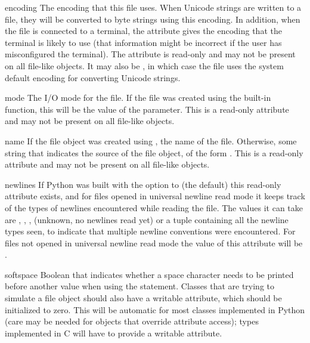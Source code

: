 \begin{memberdesc}[file]{encoding}
The encoding that this file uses. When Unicode strings are written
to a file, they will be converted to byte strings using this encoding.
In addition, when the file is connected to a terminal, the attribute
gives the encoding that the terminal is likely to use (that 
information might be incorrect if the user has misconfigured the 
terminal). The attribute is read-only and may not be present on
all file-like objects. It may also be , in which case
the file uses the system default encoding for converting Unicode
strings.

\end{memberdesc}

\begin{memberdesc}[file]{mode}
The I/O mode for the file.  If the file was created using the
 built-in function, this will be the value of the
 parameter.  This is a read-only attribute and may not be
present on all file-like objects.
\end{memberdesc}

\begin{memberdesc}[file]{name}
If the file object was created using , the name of
the file.  Otherwise, some string that indicates the source of the
file object, of the form \samp{<\mbox{\ldots}>}.  This is a read-only
attribute and may not be present on all file-like objects.
\end{memberdesc}

\begin{memberdesc}[file]{newlines}
If Python was built with the 
option to  (the default) this read-only attribute
exists, and for files opened in
universal newline read mode it keeps track of the types of newlines
encountered while reading the file. The values it can take are
, , ,  (unknown,
no newlines read yet) or a tuple containing all the newline
types seen, to indicate that multiple
newline conventions were encountered. For files not opened in universal
newline read mode the value of this attribute will be .
\end{memberdesc}

\begin{memberdesc}[file]{softspace}
Boolean that indicates whether a space character needs to be printed
before another value when using the  statement.
Classes that are trying to simulate a file object should also have a
writable  attribute, which should be initialized to
zero.  This will be automatic for most classes implemented in Python
(care may be needed for objects that override attribute access); types
implemented in C will have to provide a writable
 attribute.
\end{memberdesc}



